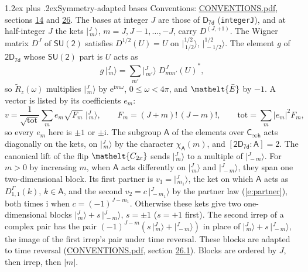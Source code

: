 \documentclass[10pt,a4paper]{article}
\makeatletter
\renewcommand\section{\@startsection{section}{1}{\z@}{-3ex plus -1ex minus -.2ex}%
  {1.2ex plus .2ex}{\normalfont\large\sffamily\bfseries\color{parttitle}}}
\numberwithin{equation}{section}
\newcommand{\eltfont}[1]{{\let\sigma\eltsigma\mathelt{#1}}}
\newcommand{\grp}[1]{\mathsf{#1}}
\newcommand{\elt}[1]{\eltfont{#1}}
\newcommand{\grpindex}[2]{[#1 : #2]}
\newcommand{\iunit}{\mathrm{i}}
\newcommand{\expe}{\mathrm{e}}
\newcommand{\irrJp}[2]{D^{(#1,#2)}}
\newcommand{\repD}[1]{D^{#1}}
\newcommand{\wignerD}[1]{D^{#1}}
\newcommand{\chiA}{\chi_{\grp{A}}}
\newcommand{\conj}[1]{{#1}^{*}}
\newcommand{\jm}[2]{\bigl\lvert{}^{#1}_{\,#2}\bigr\rangle}
\newcommand{\barred}[1]{\bar{#1}}
\newcommand{\lift}[1]{\tilde{#1}}
\makeatother
\begin{document}
\section{Symmetry-adapted bases}\label{s:bases}
Conventions: \href{../../CONVENTIONS.pdf}{CONVENTIONS.pdf}, sections \href{../../../rotation/CONVENTIONS.pdf\#conv.14}{14} and \href{../../CONVENTIONS.pdf\#conv.26}{26}.
\leavevmode\label{n:index.m}\label{n:vector.ket}The bases at integer $J$ are those of \href{../../../rotation/data/pdf/D7d.pdf}{$\grp{D_{7d}}$} (\texttt{integerJ}), and at half-integer $J$ the kets $\jm{J}{m}$, $m = J, J-1, \dots, -J$, carry $\irrJp{J}{+1}$. \label{n:matrix.wigner}The Wigner matrix $\wignerD{J}$ of $\grp{SU(2)}$ satisfies $\wignerD{1/2}(U) = U$ on $\jm{1/2}{1/2}$, $\jm{1/2}{-1/2}$. The element $g$ of $\grp{2D_{7d}}$ whose $\grp{SU(2)}$ part is $U$ acts as
\begin{equation}\label{e:action}g\,\jm{J}{m} = \sum_{m'} \jm{J}{m'}\; \conj{\wignerD{J}_{m m'}(U)},\end{equation}
so $\lift{R}_{z}(\omega)$ multiplies $\jm{J}{m}$ by $\expe^{\iunit m\omega}$, $0 \le \omega < 4\pi$, and $\elt{\barred{E}}$ by $-1$. \label{n:index.ketcoefficient}\label{n:vector.basis.symmetry}\label{n:index.ketweight}\label{n:index.total}A vector is listed by its coefficients $e_m$:
\begin{equation}\label{e:ket}v = \frac{1}{\sqrt{\mathrm{tot}}}\sum_m e_m\sqrt{F_m}\;\jm{J}{m},\qquad F_m = (J+m)!\,(J-m)!,\qquad \mathrm{tot} = \sum_m |e_m|^2F_m,\end{equation}
so every $e_m$ here is $\pm 1$ or $\pm\iunit$.
\leavevmode\label{n:group.A}\label{n:function.character.abelian}The subgroup $\grp{A}$ of the elements over $\grp{C_{\infty h}}$ acts diagonally on the kets, on $\jm{J}{m}$ by the character $\chiA(m)$, and $\grpindex{\grp{2D_{7d}}}{\grp{A}} = 2$. The canonical lift of the flip $\elt{C_{2x}}$ sends $\jm{J}{m}$ to a multiple of $\jm{J}{-m}$. For $m > 0$ by increasing $m$, when $\grp{A}$ acts differently on $\jm{J}{m}$ and $\jm{J}{-m}$, they span one two-dimensional block. \label{n:index.partner.sign}Its first partner is $v_1 = \jm{J}{m_1}$, the ket on which $\grp{A}$ acts as $\repD{\Gamma}_{1,1}(k)$, $k \in \grp{A}$, and the second $v_2 = c\,\jm{J}{-m_1}$ by the partner law (\ref{e:partner}), both times $\iunit$ when $c = (-1)^{J-m_1}$. \label{n:index.pair.sign}Otherwise these kets give two one-dimensional blocks $\jm{J}{m} + s\,\jm{J}{-m}$, $s = \pm 1$ ($s = +1$ first). The second irrep of a complex pair has the pair $(-1)^{J-m}(s\,\jm{J}{m} + \jm{J}{-m})$ in place of $\jm{J}{m} + s\,\jm{J}{-m}$, the image of the first irrep's pair under time reversal. These blocks are adapted to time reversal (\href{../../CONVENTIONS.pdf}{CONVENTIONS.pdf}, section \href{../../CONVENTIONS.pdf\#conv.26.1}{26.1}). Blocks are ordered by $J$, then irrep, then $|m|$.
\end{document}

